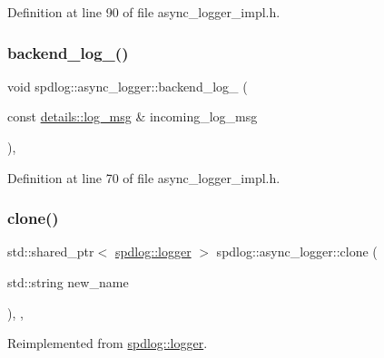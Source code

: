 Definition at line 90 of file async\+\_\+logger\+\_\+impl.\+h.

\mbox{\label{classspdlog_1_1async__logger_a50a7de9842c326ab5b99cbcc851d9c60}} 
\subsubsection{\texorpdfstring{backend\+\_\+log\+\_\+()}{backend\_log\_()}}
{\footnotesize\ttfamily void spdlog\+::async\+\_\+logger\+::backend\+\_\+log\+\_\+ (\begin{DoxyParamCaption}\item[{const \hyperlink{structspdlog_1_1details_1_1log__msg}{details\+::log\+\_\+msg} \&}]{incoming\+\_\+log\+\_\+msg }\end{DoxyParamCaption})\hspace{0.3cm}{\ttfamily [inline]}, {\ttfamily [protected]}}



Definition at line 70 of file async\+\_\+logger\+\_\+impl.\+h.

\mbox{\label{classspdlog_1_1async__logger_aef60bc96b78ff98a471dc08977d4cb5c}} 
\subsubsection{\texorpdfstring{clone()}{clone()}}
{\footnotesize\ttfamily std\+::shared\+\_\+ptr$<$ \hyperlink{classspdlog_1_1logger}{spdlog\+::logger} $>$ spdlog\+::async\+\_\+logger\+::clone (\begin{DoxyParamCaption}\item[{std\+::string}]{new\+\_\+name }\end{DoxyParamCaption})\hspace{0.3cm}{\ttfamily [inline]}, {\ttfamily [override]}, {\ttfamily [virtual]}}



Reimplemented from \hyperlink{classspdlog_1_1logger_a649a3c1a1b380e2488a93f9c3ae694de}{spdlog\+::logger}.



